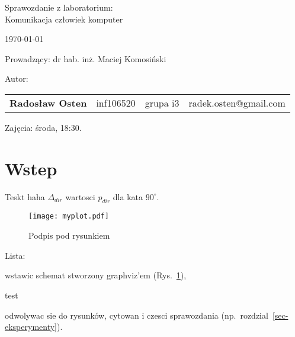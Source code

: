 \documentclass{article}
\begin{document}


\thispagestyle{empty} %

\begin{center}

	{\large{Sprawozdanie z laboratorium:\\
	Komunikacja człowiek komputer}}

	\vspace{6ex}

	{\footnotesize\today}

\end{center}


\vspace{10ex}

Prowadzący: dr hab. inż. Maciej Komosiński

\vspace{5ex}

Autor:
\begin{tabular}{lllr}
\textbf{Radosław Osten} & inf106520 & grupa i3 & radek.osten@gmail.com \\
\end{tabular}

\vspace{5ex}

Zajęcia: środa, 18:30.


\newpage





\section{Wstep}

Teskt haha
$\Delta_{dir}$ wartosci $p_{dir}$ dla kata $90^\circ$.



\begin{figure}[!ht]
\begin{center}
\texttt{[image: myplot.pdf]}
\end{center}
\caption{Podpis pod rysunkiem}
\label{fig-schemat}
\end{figure}


Lista:

\begin{tightlist}
\item wstawic schemat stworzony graphviz'em (Rys.~\ref{fig-schemat}),
\item test
\item odwolywac sie do rysunków, cytowan i czesci sprawozdania (np.\ rozdzial~\ref{sec-eksperymenty}).
\end{tightlist}
\end{document}
